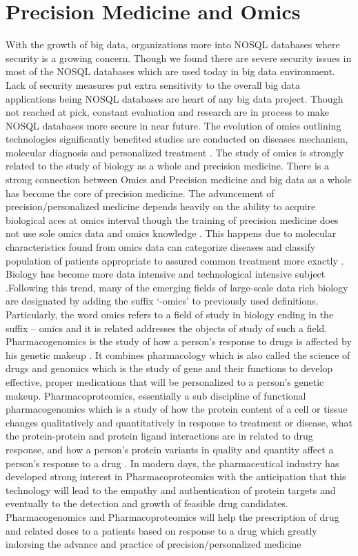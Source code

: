 \documentclass[sigconf]{acmart}
\begin{document}
\section{Precision Medicine and Omics}
With the growth of big data, organizations more into NOSQL databases where security is a growing concern. Though we found there are severe security issues in most of the NOSQL databases which are used today in big data environment. Lack of security measures put extra sensitivity to the overall big data applications being NOSQL databases are heart of any big data project. Though not reached at pick, constant evaluation and research are in process to make NOSQL databases more secure in near future. The evolution of omics outlining technologies significantly benefited studies are conducted on diseases mechanism, molecular diagnosis and personalized treatment \cite{editor03}. The study of omics is strongly related to the study of biology as a whole and precision medicine. There is a strong connection between Omics and Precision medicine and big data as a whole has become the core of precision medicine. The advancement of precision/personalized medicine depends heavily on the ability to acquire biological aces at omics interval though the training of precision medicine does not use sole omics data and omics knowledge \cite{editor08}. This happens due to molecular characteristics found from omics data can categorize diseases and classify population of patients appropriate to assured common treatment more exactly \cite{editor03}.
Biology has become more data intensive and technological intensive subject .Following this trend, many of the emerging fields of large-scale data rich biology are designated by adding the suffix ‘-omics’ to previously used definitions. Particularly, the word omics refers to a field of study in biology ending in the suffix – omics and it is related addresses the objects of study of such a field\cite{editor03}\cite{editor05}.
Pharmacogenomics is the study of how a person’s response to drugs is affected by his genetic makeup \cite{editor02}. It combines pharmacology which is also called the science of drugs and genomics which is the study of gene and their functions to develop effective, proper medications that will be personalized to a person’s genetic makeup. Pharmacoproteomics, essentially a sub discipline of functional pharmacogenomics which is a study of how the protein content of a cell or tissue changes qualitatively and quantitatively in response to treatment or disease, what the protein-protein and protein ligand interactions are in related to drug response, and how a person’s protein variants in quality and quantity affect a person’s response to a drug \cite{editor04}. In modern days, the pharmaceutical industry has developed strong interest in Pharmacoproteomics with the anticipation that this technology will lead to the empathy and authentication of protein targets and eventually to the detection and growth of feasible drug candidates. Pharmacogenomics and Pharmacoproteomics will help the prescription of drug and related doses to a patients based on response to a drug which greatly indorsing the advance and practice of precision/personalized medicine \cite{editor04}
\end{document}
